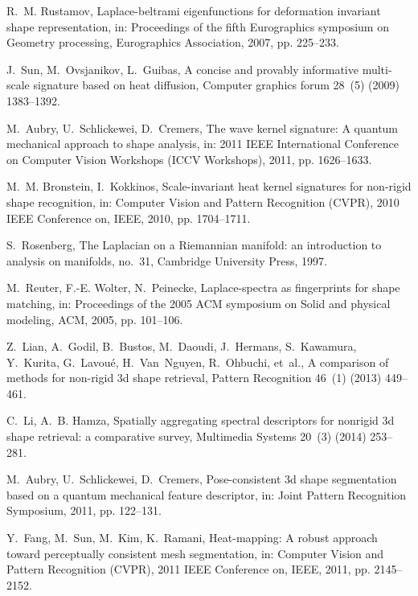 \documentclass[5p,twocolumn,10pt,times]{elsarticle}
\begin{document}
\begin{thebibliography}{10}
R.~M. Rustamov, Laplace-beltrami eigenfunctions for deformation invariant shape
  representation, in: Proceedings of the fifth Eurographics symposium on
  Geometry processing, Eurographics Association, 2007, pp. 225--233.

J.~Sun, M.~Ovsjanikov, L.~Guibas, A concise and provably informative
  multi-scale signature based on heat diffusion, Computer graphics forum 28~(5)
  (2009) 1383--1392.

M.~Aubry, U.~Schlickewei, D.~Cremers, The wave kernel signature: A quantum
  mechanical approach to shape analysis, in: 2011 IEEE International Conference
  on Computer Vision Workshops (ICCV Workshops), 2011, pp. 1626--1633.

M.~M. Bronstein, I.~Kokkinos, Scale-invariant heat kernel signatures for
  non-rigid shape recognition, in: Computer Vision and Pattern Recognition
  (CVPR), 2010 IEEE Conference on, IEEE, 2010, pp. 1704--1711.

S.~Rosenberg, The Laplacian on a Riemannian manifold: an introduction to
  analysis on manifolds, no.~31, Cambridge University Press, 1997.

M.~Reuter, F.-E. Wolter, N.~Peinecke, Laplace-spectra as fingerprints for shape
  matching, in: Proceedings of the 2005 ACM symposium on Solid and physical
  modeling, ACM, 2005, pp. 101--106.

Z.~Lian, A.~Godil, B.~Bustos, M.~Daoudi, J.~Hermans, S.~Kawamura, Y.~Kurita,
  G.~Lavou{\'e}, H.~Van~Nguyen, R.~Ohbuchi, et~al., A comparison of methods for
  non-rigid 3d shape retrieval, Pattern Recognition 46~(1) (2013) 449--461.

C.~Li, A.~B. Hamza, Spatially aggregating spectral descriptors for nonrigid 3d
  shape retrieval: a comparative survey, Multimedia Systems 20~(3) (2014)
  253--281.

M.~Aubry, U.~Schlickewei, D.~Cremers, Pose-consistent 3d shape segmentation
  based on a quantum mechanical feature descriptor, in: Joint Pattern
  Recognition Symposium, 2011, pp. 122--131.

Y.~Fang, M.~Sun, M.~Kim, K.~Ramani, Heat-mapping: A robust approach toward
  perceptually consistent mesh segmentation, in: Computer Vision and Pattern
  Recognition (CVPR), 2011 IEEE Conference on, IEEE, 2011, pp. 2145--2152.


\end{thebibliography}
\end{document}
